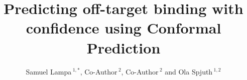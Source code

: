 \documentclass[utf8]{frontiersSCNS} %
\def\firstAuthorLast{Sample {et~al.}} %
\def\Authors{Samuel Lampa\,$^{1,*}$, Co-Author\,$^{2}$, Co-Author\,$^{2}$ and Ola Spjuth\,$^{1,2}$}
\begin{document}
\onecolumn
{}

\title[Predicting off-target binding with confidence using Conformal Prediction]{Predicting off-target binding with confidence using Conformal Prediction}

\author[\firstAuthorLast ]{\Authors} %
\address{} %
\correspondance{} %

\extraAuth{}%


\maketitle
\end{document}
